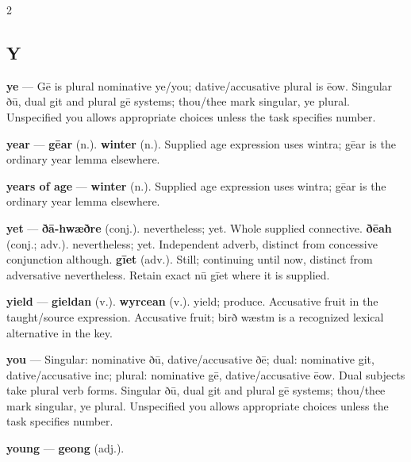 \begin{multicols}{2}
\subsection*{Y}
\textbf{ye} — Gē is plural nominative ye/you; dative/accusative plural is ēow. Singular ðū, dual git and plural gē systems; thou/thee mark singular, ye plural. Unspecified you allows appropriate choices unless the task specifies number.\par
\textbf{year} — \textbf{gēar} (n.).  \textbf{winter} (n.). Supplied age expression uses wintra; gēar is the ordinary year lemma elsewhere.\par
\textbf{years of age} — \textbf{winter} (n.). Supplied age expression uses wintra; gēar is the ordinary year lemma elsewhere.\par
\textbf{yet} — \textbf{ðā-hwæðre} (conj.). nevertheless; yet. Whole supplied connective. \textbf{ðēah} (conj.; adv.). nevertheless; yet. Independent adverb, distinct from concessive conjunction although. \textbf{gīet} (adv.). Still; continuing until now, distinct from adversative nevertheless. Retain exact nū gīet where it is supplied.\par
\textbf{yield} — \textbf{gieldan} (v.).  \textbf{wyrcean} (v.). yield; produce. Accusative fruit in the taught/source expression. Accusative fruit; birð wæstm is a recognized lexical alternative in the key.\par
\textbf{you} — Singular: nominative ðū, dative/accusative ðē; dual: nominative git, dative/accusative inc; plural: nominative gē, dative/accusative ēow. Dual subjects take plural verb forms. Singular ðū, dual git and plural gē systems; thou/thee mark singular, ye plural. Unspecified you allows appropriate choices unless the task specifies number.\par
\textbf{young} — \textbf{geong} (adj.).\par

\end{multicols}
